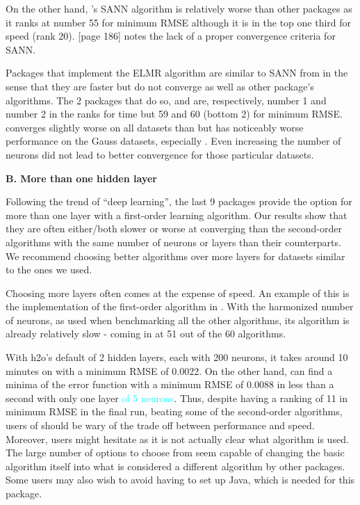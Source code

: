 On the other hand, 's SANN algorithm is relatively worse
than other packages as it ranks at number 55 for minimum RMSE although
it is in the top one third for speed (rank 20).
\cite{Nash-nlpor14}{[}page 186{]} notes the lack of a proper convergence
criteria for SANN.

Packages that implement the ELMR algorithm are similar to SANN from
 in the sense that they are faster but do not converge as
well as other package's algorithms. The 2 packages that do so,
 \citep{R-elmNNRcpp} and 
\citep{R-ELMR} are, respectively, number 1 and number 2 in the ranks for
time but 59 and 60 (bottom 2) for minimum RMSE.  converges
slightly worse on all datasets than  but has noticeably
worse performance on the Gauss datasets, especially . Even
increasing the number of neurons did not lead to better convergence for
those particular datasets.

\textbf{B. More than one hidden layer}

Following the trend of ``deep learning'', the last 9 packages provide
the option for more than one layer with a first-order learning
algorithm. Our results show that they are often either/both slower or
worse at converging than the second-order algorithms with the same
number of neurons or layers than their counterparts. We recommend
choosing better algorithms over more layers for datasets similar to the
ones we used.

Choosing more layers often comes at the expense of speed. An example of
this is the implementation of the first-order algorithm in 
\citep{R-h2o}. With the harmonized number of neurons, as used when
benchmarking all the other algorithms, its algorithm is already
relatively slow - coming in at 51 out of the 60 algorithms.

With h2o's default of 2 hidden layers, each with 200 neurons, it takes
around 10 minutes on  with a minimum RMSE of 0.0022. On
the other hand,  can find a minima of the error function with
a minimum RMSE of 0.0088 in less than a second with only one layer
\textcolor{cyan}{of 5 neurons}. Thus, despite having a ranking of 11 in
minimum RMSE in the final run, beating some of the second-order
algorithms, users of  should be wary of the trade off between
performance and speed. Moreover, users might hesitate as it is not
actually clear what algorithm is used. The large number of options to
choose from seem capable of changing the basic algorithm itself into
what is considered a different algorithm by other packages. Some users
may also wish to avoid having to set up \textsf{Java}, which is needed
for this package.

